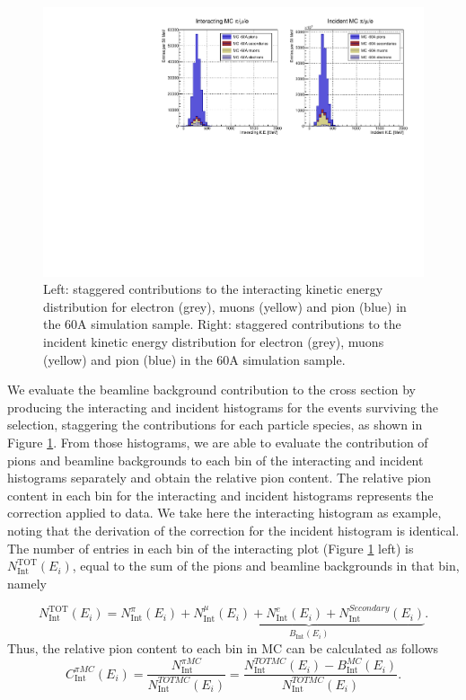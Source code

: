 \begin{figure}[p]
\centering
\includegraphics[width=\textwidth]{Chapter-5/Images/Background60A.pdf}
\caption{Left: staggered contributions to the interacting kinetic energy distribution for electron (grey), muons (yellow) and pion (blue) in the 60A simulation sample. Right: staggered contributions to the incident kinetic energy distribution for electron (grey), muons (yellow) and pion (blue) in the 60A simulation sample.  }
\label{fig:stag60A}
\end{figure}

We evaluate the beamline background contribution to the cross section by producing the interacting and incident histograms for the events surviving the selection, staggering the contributions for each particle species, as shown in Figure  \ref{fig:stag60A}. From those histograms, we are able to evaluate the contribution of  pions and  beamline backgrounds to each bin of the interacting and incident histograms separately and obtain the relative pion content. The relative pion content in each bin for the interacting and incident histograms represents the correction applied to data. We take here the interacting histogram as example, noting that the derivation of the correction for the incident histogram is identical. The number of entries in each bin of the interacting plot (Figure \ref{fig:stag60A} left) is  $N^{\text{TOT}}_{\text{Int}} (E_{i})$, equal to the sum of the pions and beamline backgrounds in that bin, namely

\begin{equation}
N^{\text{TOT}}_{\text{Int}} (E_{i}) =  N^\pi_{\text{Int}} (E_{i}) + \underbrace{ N^\mu_{\text{Int}} (E_{i}) + N^e_{\text{Int}} (E_{i}) + N^{Secondary}_{\text{Int}} (E_{i}) }_{B_{\text{Int}} (E_i)}.
\end{equation}
Thus, the relative pion content to each bin in MC can be calculated as follows
\begin{equation}
C^{\pi MC}_{\text{Int}} (E_{i}) =  \frac{N^{\pi MC}_{\text{Int}}}{ N^{TOT MC}_{\text{Int}} (E_{i}) } =    \frac{N^{TOT MC}_{\text{Int}} (E_{i}) - B^ {MC}_{\text{Int}} (E_i)}{ N^{TOT MC}_{\text{Int}} (E_{i})}.
\end{equation}


